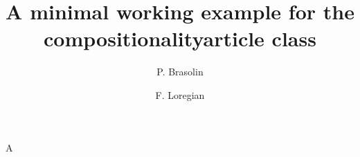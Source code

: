 \documentclass[accepted=2999-29-02,volume=9999,issue=9999,published=true]{compositionalityarticle}
\title{A minimal working example for the compositionalityarticle class}
\author{P. Brasolin}
\author{F. Loregian}
\begin{document}
\maketitle
A
\end{document}
